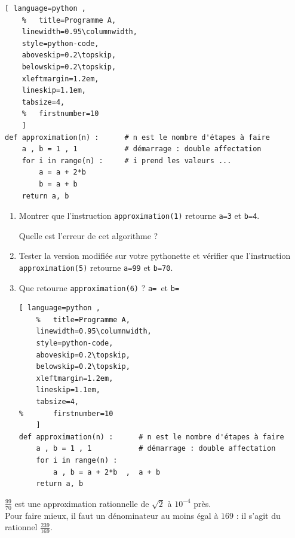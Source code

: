 \begin{lstlisting}[ language=python , 
	%	title=Programme A,   
	linewidth=0.95\columnwidth,
	style=python-code,    
	aboveskip=0.2\topskip,
	belowskip=0.2\topskip,
	xleftmargin=1.2em,
	lineskip=1.1em,
	tabsize=4,
	%	firstnumber=10  
	]
def approximation(n) : 		# n est le nombre d'étapes à faire
	a , b = 1 , 1			# démarrage : double affectation
	for i in range(n) :		# i prend les valeurs ...
		a = a + 2*b 
		b = a + b
	return a, b
\end{lstlisting} 
 \begin{enumerate}[label={\alph*)},leftmargin=*]
 	\item Montrer que l'instruction \lstinline|approximation(1)| retourne \lstinline|a=3| et \lstinline|b=4|. 
 	
 	Quelle est l'erreur de cet algorithme ?
 	\vfill 
 	\item Tester la version modifiée sur votre pythonette et vérifier que l'instruction \lstinline|approximation(5)| retourne  \lstinline|a=99| et \lstinline|b=70|.
 	\item Que retourne \lstinline|approximation(6)| ? \hfill \lstinline|a= |\hfill  et \lstinline|b= | \hfill\null 
 
 \begin{lstlisting}[ language=python , 
 	%	title=Programme A,   
 	linewidth=0.95\columnwidth,
 	style=python-code,    
 	aboveskip=0.2\topskip,
 	belowskip=0.2\topskip,
 	xleftmargin=1.2em,
 	lineskip=1.1em,
 	tabsize=4,
% 		firstnumber=10  
 	] 	 
def approximation(n) : 		# n est le nombre d'étapes à faire
	a , b = 1 , 1			# démarrage : double affectation
	for i in range(n) :	 
		a , b = a + 2*b  ,  a + b
	return a, b
\end{lstlisting}  
\end{enumerate}

\begin{tBox}
	$\frac{99}{70}$ est une approximation rationnelle de $\sqrt{2}$ à $10^{-4}$ près. \\
	Pour faire mieux, il faut un dénominateur au moins égal à $169$ : il s'agit du rationnel $\frac{239}{169}$.
	
\end{tBox} 




%	 
